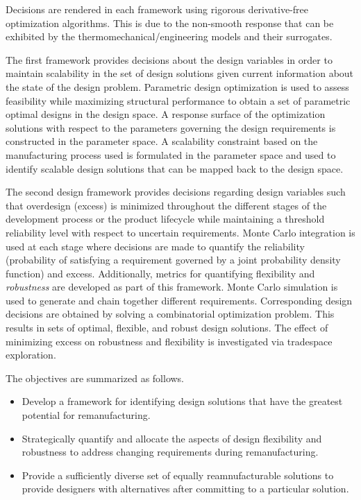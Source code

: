 Decisions are rendered in each framework using rigorous derivative-free optimization algorithms. This is due to the non-smooth response that can be exhibited by the thermomechanical/engineering models and their surrogates.

The first framework provides decisions about the design variables in order to maintain scalability in the set of design solutions given current information about the state of the design problem. Parametric design optimization is used to assess feasibility while maximizing structural performance to obtain a set of parametric optimal designs in the design space. A response surface of the optimization solutions with respect to the parameters governing the design requirements is constructed in the parameter space. A scalability constraint based on the manufacturing process used is formulated in the parameter space and used to identify scalable design solutions that can be mapped back to the design space.

The second design framework provides decisions regarding design variables such that overdesign (excess) is minimized throughout the different stages of the development process or the product lifecycle while maintaining a threshold reliability level with respect to uncertain requirements. Monte Carlo integration is used at each stage where decisions are made to quantify the reliability (probability of satisfying a requirement governed by a joint probability density function) and excess. Additionally, metrics for quantifying flexibility and \textit{robustness} are developed as part of this framework. Monte Carlo simulation is used to generate and chain together different requirements. Corresponding design decisions are obtained by solving a combinatorial optimization problem. This results in sets of optimal, flexible, and robust design solutions. The effect of minimizing excess on robustness and flexibility is investigated via tradespace exploration.

The objectives are summarized as follows.

\begin{itemize}
	\item{Develop a framework for identifying design solutions that have the greatest potential for remanufacturing.}
	\item{Strategically quantify and allocate the aspects of design flexibility and robustness to address changing requirements during remanufacturing.}
	\item{Provide a sufficiently diverse set of equally reamnufacturable solutions to provide designers with alternatives after committing to a particular solution.}
\end{itemize}

